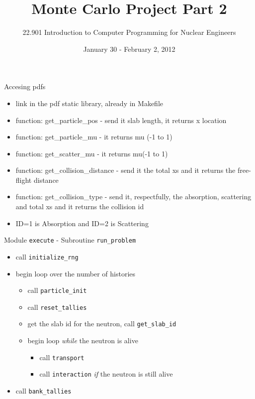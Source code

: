 \documentclass{beamer}
\title[]{Monte Carlo Project Part 2}
\author[]{22.901 Introduction to Computer Programming for Nuclear Engineers}
\institute[\insertpagenumber]{}
\date{January 30 - February 2, 2012}
\begin{document}

\frame{\titlepage}
\begin{frame}{Accesing pdfs}

  \begin{itemize}
    \item link in the pdf static library, already in Makefile
    \vfill\item function: get\_particle\_pos - send it slab length, it returns x location
    \vfill\item function: get\_particle\_mu - it returns mu (-1 to 1)
    \vfill\item function: get\_scatter\_mu - it returns mu(-1 to 1)
    \vfill\item function: get\_collision\_distance - send it the total xs and it returns the free-flight distance
    \vfill\item function: get\_collision\_type - send it, respectfully, the absorption, scattering and total xs and it returns the collision id
    \vfill\item ID=1 is Absorption and ID=2 is Scattering
  \end{itemize}

\end{frame}
\begin{frame}{Module \texttt{execute} - Subroutine \texttt{run\_problem}}

  \begin{itemize}
    \item call \texttt{initialize\_rng}
    \vfill\item begin loop over the number of histories
    \begin{itemize}
        \vfill\item call \texttt{particle\_init}
        \vfill\item call \texttt{reset\_tallies}
        \vfill\item get the slab id for the neutron, call \texttt{get\_slab\_id}
        \vfill\item begin loop \emph{while} the neutron is alive
	\begin{itemize}
	  \vfill\item call \texttt{transport}
	  \vfill\item call \texttt{interaction} \emph{if} the neutron is still alive
	\end{itemize}
    \end{itemize}
    \vfill\item call \texttt{bank\_tallies}
  \end{itemize}

\end{frame}
\end{document}
